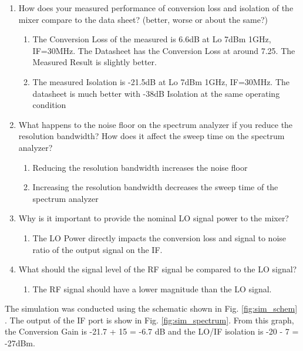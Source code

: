 \documentclass[journal]{IEEEtran}
\begin{document}
\begin{enumerate}

    \item  How does your measured performance of conversion loss and isolation of the mixer compare to the data sheet? (better, worse or about the same?)
          \begin{enumerate}
              \item  The Conversion Loss of the measured is 6.6dB at Lo 7dBm 1GHz, IF=30MHz. The Datasheet has the Conversion Loss at around 7.25. The Measured Result is slightly better.
              \item  The measured Isolation  is -21.5dB  at Lo 7dBm 1GHz, IF=30MHz. The datasheet is much better with -38dB Isolation at the same operating condition
          \end{enumerate}
    \item  What happens to the noise floor on the spectrum analyzer if you reduce the resolution bandwidth? How does it affect the sweep time on the spectrum analyzer?
          \begin{enumerate}
              \item  Reducing the resolution bandwidth increases the noise floor
              \item  Increasing the resolution bandwidth decreases the sweep time of the spectrum analyzer
          \end{enumerate}
    \item  Why is it important to provide the nominal LO signal power to the mixer?
          \begin{enumerate}
              \item  The LO Power directly impacts the conversion loss and signal to noise ratio of the output signal on the IF.
          \end{enumerate}
    \item  What should the signal level of the RF signal be compared to the LO signal?

          \begin{enumerate}
              \item The  RF signal should have a lower magnitude than the LO signal.
          \end{enumerate}

\end{enumerate}

The simulation was conducted using the schematic shown in Fig.
\ref{fig:sim_schem} . The output of the IF port is show in Fig.
\ref{fig:sim_spectrum}. From this graph, the Conversion Gain is -21.7 + 15 =
-6.7 dB  and the LO/IF isolation is  -20 - 7 = -27dBm.
\end{document}
